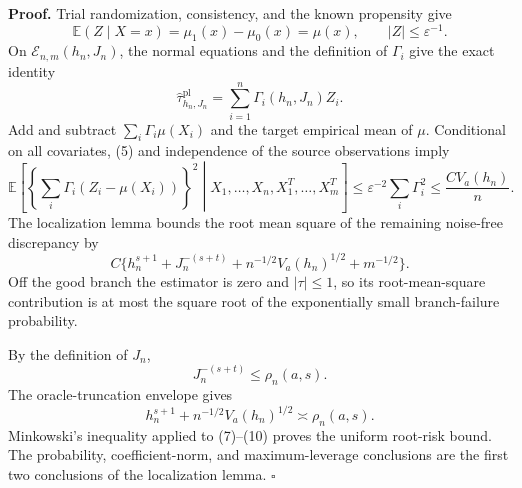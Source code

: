 \textbf{Proof.}
Trial randomization, consistency, and the known propensity give
\[
\mathbb E(Z\mid X=x)=\mu_1(x)-\mu_0(x)=\mu(x),
\qquad |Z|\le\varepsilon^{-1}.
\tag{5}
\]
On \(\mathcal E_{n,m}(h_n,J_n)\), the normal equations and the definition of \(\Gamma_i\) give the exact identity
\[
\widehat\tau^{\mathrm{pl}}_{h_n,J_n}=\sum_{i=1}^n\Gamma_i(h_n,J_n)Z_i.
\tag{6}
\]
Add and subtract \(\sum_i\Gamma_i\mu(X_i)\) and the target empirical mean of \(\mu\). Conditional on all covariates, (5) and independence of the source observations imply
\[
\mathbb E\left[\left\{\sum_i\Gamma_i(Z_i-\mu(X_i))\right\}^2\middle|X_1,\ldots,X_n,X_1^T,\ldots,X_m^T\right]
\le\varepsilon^{-2}\sum_i\Gamma_i^2
\le \frac{CV_a(h_n)}n.
\tag{7}
\]
The localization lemma bounds the root mean square of the remaining noise-free discrepancy by
\[
C\{h_n^{s+1}+J_n^{-(s+t)}+n^{-1/2}V_a(h_n)^{1/2}+m^{-1/2}\}.
\tag{8}
\]
Off the good branch the estimator is zero and \(|\tau|\le1\), so its root-mean-square contribution is at most the square root of the exponentially small branch-failure probability.

By the definition of \(J_n\),
\[
J_n^{-(s+t)}\le\rho_n(a,s).
\tag{9}
\]
The oracle-truncation envelope gives
\[
h_n^{s+1}+n^{-1/2}V_a(h_n)^{1/2}\asymp\rho_n(a,s).
\tag{10}
\]
Minkowski's inequality applied to (7)--(10) proves the uniform root-risk bound. The probability, coefficient-norm, and maximum-leverage conclusions are the first two conclusions of the localization lemma. \(\square\)
